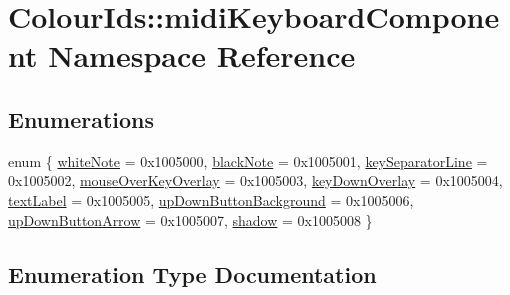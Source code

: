 \hypertarget{namespaceColourIds_1_1midiKeyboardComponent}{}\section{Colour\+Ids\+:\+:midi\+Keyboard\+Component Namespace Reference}
\label{namespaceColourIds_1_1midiKeyboardComponent}
\subsection*{Enumerations}
\begin{DoxyCompactItemize}
\item 
enum \{ \newline
\mbox{\hyperlink{namespaceColourIds_1_1midiKeyboardComponent_a28c62c05640b3bddd6ccb5d9473aa62ba1a7fd73351faa278c83993bdef4bae5d}{white\+Note}} = 0x1005000, 
\mbox{\hyperlink{namespaceColourIds_1_1midiKeyboardComponent_a28c62c05640b3bddd6ccb5d9473aa62ba834a5c71234172656c245e4d8eea3437}{black\+Note}} = 0x1005001, 
\mbox{\hyperlink{namespaceColourIds_1_1midiKeyboardComponent_a28c62c05640b3bddd6ccb5d9473aa62baa0bb43ee6f211f4c39b98b69b69ac404}{key\+Separator\+Line}} = 0x1005002, 
\mbox{\hyperlink{namespaceColourIds_1_1midiKeyboardComponent_a28c62c05640b3bddd6ccb5d9473aa62ba3c8e1da2afe41b2302cac8d712b23c02}{mouse\+Over\+Key\+Overlay}} = 0x1005003, 
\newline
\mbox{\hyperlink{namespaceColourIds_1_1midiKeyboardComponent_a28c62c05640b3bddd6ccb5d9473aa62ba5cec6c032e88b485851a084ca654582b}{key\+Down\+Overlay}} = 0x1005004, 
\mbox{\hyperlink{namespaceColourIds_1_1midiKeyboardComponent_a28c62c05640b3bddd6ccb5d9473aa62bac1f863419d5ed83c376a58d80dae3f48}{text\+Label}} = 0x1005005, 
\mbox{\hyperlink{namespaceColourIds_1_1midiKeyboardComponent_a28c62c05640b3bddd6ccb5d9473aa62ba1f5b7ee97abb9f57af5f3b4149a15860}{up\+Down\+Button\+Background}} = 0x1005006, 
\mbox{\hyperlink{namespaceColourIds_1_1midiKeyboardComponent_a28c62c05640b3bddd6ccb5d9473aa62ba53b4d7b99bd656282c1afd1daa8bd30a}{up\+Down\+Button\+Arrow}} = 0x1005007, 
\newline
\mbox{\hyperlink{namespaceColourIds_1_1midiKeyboardComponent_a28c62c05640b3bddd6ccb5d9473aa62ba55f7e5a075b98b7174f4a8130a536c95}{shadow}} = 0x1005008
 \}
\end{DoxyCompactItemize}


\subsection{Enumeration Type Documentation}
\mbox{\label{namespaceColourIds_1_1midiKeyboardComponent_a28c62c05640b3bddd6ccb5d9473aa62b}} 
